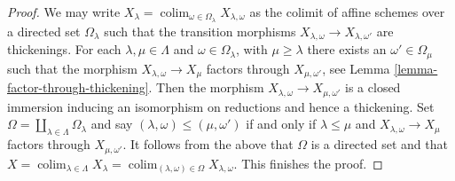 \documentclass{stacks-project}
\theoremstyle{plain}
\theoremstyle{definition}
\theoremstyle{remark}
\numberwithin{equation}{subsection}
\def\colim{\mathop{\mathrm{colim}}\nolimits}
\begin{document}
\begin{proof}
We may write
$X_\lambda = \colim_{\omega \in \Omega_\lambda} X_{\lambda, \omega}$
as the colimit of affine schemes over a directed set
$\Omega_\lambda$ such that the transition morphisms
$X_{\lambda, \omega} \to X_{\lambda, \omega'}$
are thickenings. For each $\lambda, \mu \in \Lambda$
and $\omega \in \Omega_\lambda$, with $\mu \geq \lambda$
there exists an $\omega' \in \Omega_\mu$ such that the morphism
$X_{\lambda, \omega} \to X_\mu$ factors through $X_{\mu, \omega'}$, see
Lemma \ref{lemma-factor-through-thickening}. Then
the morphism $X_{\lambda, \omega} \to X_{\mu, \omega'}$
is a closed immersion inducing an isomorphism on reductions
and hence a thickening. Set
$\Omega = \coprod_{\lambda \in \Lambda} \Omega_\lambda$
and say $(\lambda, \omega) \leq (\mu, \omega')$ if and only if
$\lambda \leq \mu$ and $X_{\lambda, \omega} \to X_\mu$ factors through
$X_{\mu, \omega'}$. It follows from the above that
$\Omega$ is a directed set and that
$X = \colim_{\lambda \in \Lambda} X_\lambda =
\colim_{(\lambda, \omega) \in \Omega} X_{\lambda, \omega}$.
This finishes the proof.
\end{proof}
\end{document}
